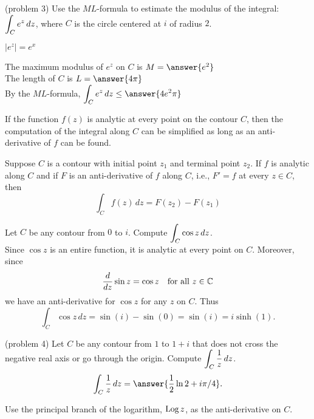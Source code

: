 \documentclass[handout]{ximera}
\begin{document}
\begin{problem}(problem 3)
Use the $ML$-formula to estimate the modulus of the integral: $\displaystyle \int_C e^z \, dz$,
where $C$ is the circle centered at $i$ of radius $2$.\\
\begin{hint}
$|e^z| = e^x$
\end{hint}
The maximum modulus of $e^z$ on $C$ is $M = \answer{e^2}$\\
The length of $C$ is $L = \answer{4\pi}$\\
By the $ML$-formula, $\dis \int_C e^z \, dz \leq \answer{4e^2 \pi}$
\end{problem}
If the function $f(z)$ is analytic at every point on the contour $C$, then the computation of the integral along $C$
can be simplified as long as an anti-derivative of $f$ can be found.

\begin{theorem}
Suppose $C$ is a contour with initial point $z_1$ and terminal point $z_2$. If $f$ is analytic along $C$ and 
if $F$ is an anti-derivative of $f$ along $C$, i.e., $F' = f$ at every $z \in C$,
then
\[
\int_C f(z) \, dz = F(z_2) -F(z_1)
\]
\end{theorem}

\begin{example}[example 4]
Let $C$ be any contour from $0$ to $i$. Compute $\displaystyle \int_C \cos z \, dz$.\\
Since $\cos z$ is an entire function, it is analytic at every point on $C$. Moreover, since
\[
\frac{d}{dz} \sin z = \cos z \quad \text{for all} \,\, z \in \mathbb C
\]
we have an anti-derivative for $\cos z$ for any $z$ on $C$. Thus
\[
\int_C \cos z \, dz = \sin(i) - \sin(0) = \sin(i) = i\sinh(1).
\]
\end{example}

\begin{problem}(problem 4)
Let $C$ be any contour from $1$ to $1+i$ that does not cross the negative real axis or go through the origin. 
Compute $\displaystyle \int_C \frac{1}{z} \, dz$.\\
\[
\int_C \frac{1}{z} \, dz = \answer{\frac12 \ln 2+ i\pi/4}.
\]
\begin{hint}
Use the principal branch of the logarithm, $\operatorname{Log} z$, as the anti-derivative on $C$.
\end{hint}
\end{problem}
\end{document}
